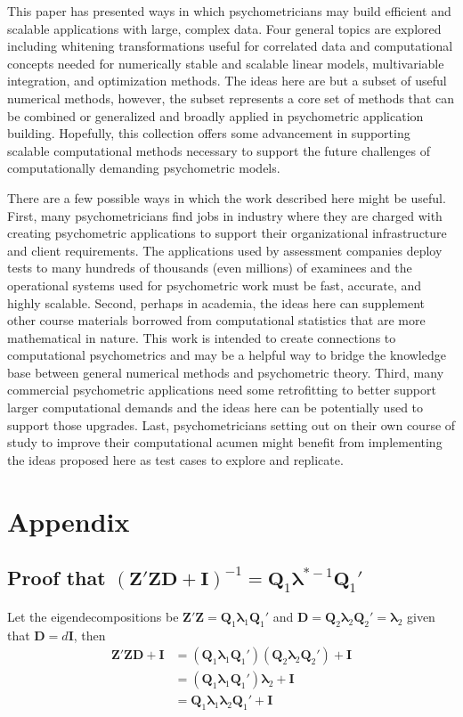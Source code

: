 \documentclass[12pt]{article}
\begin{document}
This paper has presented ways in which psychometricians may build efficient and scalable applications with large, complex data. Four general topics are explored including whitening transformations useful for correlated data and computational concepts needed for numerically stable and scalable linear models, multivariable integration, and optimization methods. The ideas here are but a subset of useful numerical methods, however, the subset represents a core set of methods that can be combined or generalized and broadly applied in psychometric application building. Hopefully, this collection offers some advancement in supporting scalable computational methods necessary to support the future challenges of computationally demanding psychometric models. 

There are a few possible ways in which the work described here might be useful. First, many psychometricians find jobs in industry where they are charged with creating psychometric applications to support their organizational infrastructure and client requirements. The applications used by assessment companies deploy tests to many hundreds of thousands (even millions) of examinees and the operational systems used for psychometric work must be fast, accurate, and highly scalable. Second, perhaps in academia, the ideas here can supplement other course materials borrowed from computational statistics that are more mathematical in nature. This work is intended to create connections to computational psychometrics and may be a helpful way to bridge the knowledge base between general numerical methods and psychometric theory. Third, many commercial psychometric applications need some retrofitting to better support larger computational demands and the ideas here can be potentially used to support those upgrades. Last, psychometricians setting out on their own course of study to improve their computational acumen might benefit from implementing the ideas proposed here as test cases to explore and replicate.


\newpage
\section*{Appendix}

\subsection*{Proof that $(\bm{Z}'\bm{Z}\bm{D} + \bm{I})^{-1} = \bm{Q}_1 \bm{\lambda}^{*-1} \bm{Q}_1'$}

Let the eigendecompositions be $\bm{Z}'\bm{Z} = \bm{Q}_1 \bm{\lambda}_1 \bm{Q}_1'$ and $\bm{D}=\bm{Q}_2 \bm{\lambda}_2 \bm{Q}_2'= \bm{\lambda}_2$ given that $\bm{D}=d\bm{I}$, then
\begin{align}
\bm{Z}'\bm{Z}\bm{D} + \bm{I} & = (\bm{Q}_1 \bm{\lambda}_1 \bm{Q}_1')(\bm{Q}_2 \bm{\lambda}_2 \bm{Q}_2') + \bm{I}\\
		& = (\bm{Q}_1 \bm{\lambda}_1 \bm{Q}_1')\bm{\lambda}_2 + \bm{I}\\
		&= \bm{Q}_1 \bm{\lambda}_1\bm{\lambda}_2 \bm{Q}_1' + \bm{I}
\end{align}
\end{document}
